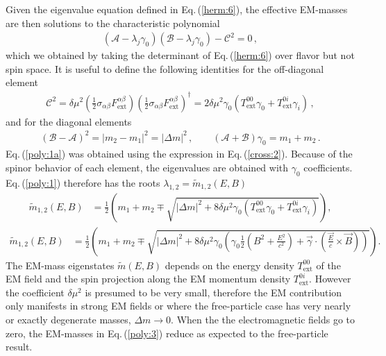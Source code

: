\documentclass{ws-ijmpa}
\newcommand{\req}[1]{Eq.\,(\ref{#1})}
\begin{document}
Given the eigenvalue equation defined in \req{herm:6}, the effective EM-masses are then solutions to the characteristic polynomial
\begin{align}
\label{poly:1}
(\mathcal{A}-\lambda_{j}\gamma_{0})(\mathcal{B}-\lambda_{j}\gamma_{0})-\mathcal{C}^{2}=0\,,
\end{align}
which we obtained by taking the determinant of \req{herm:6} over flavor but not spin space. It is useful to define the following identities for the off-diagonal element
\begin{align}
\label{poly:1a}
\mathcal{C}^{2} = 
\delta\mu^{2}\left(\frac{1}{2}\sigma_{\alpha\beta}F^{\alpha\beta}_\mathrm{ext}\right)\left(\frac{1}{2}\sigma_{\alpha\beta}F^{\alpha\beta}_\mathrm{ext}\right)^{\dag}=
2\delta\mu^{2}\gamma_{0}\left(T_\mathrm{ext}^{00}\gamma_{0}+T_\mathrm{ext}^{0i}\gamma_{i}\right)\,,
\end{align}
and for the diagonal elements
\begin{align}
(\mathcal{B}-\mathcal{A})^{2} = |m_{2}-m_{1}|^{2} = |\Delta m|^{2}\,,\qquad (\mathcal{A}+\mathcal{B})\gamma_{0} = m_{1} + m_{2}\,.
\end{align}
\req{poly:1a} was obtained using the expression in \req{cross:2}. Because of the spinor behavior of each element, the eigenvalues are obtained with $\gamma_{0}$ coefficients. \req{poly:1} therefore has the roots $\lambda_{1,2} = \widetilde m_{1,2}(E,B)$
\begin{align}
\label{poly:2}
\widetilde m_{1,2}(E,B)\! &=\! \frac{1}{2}\left(m_{1}\!+\!m_{2}\!\mp\!\sqrt{|\Delta m|^{2}\!+\!8\delta\mu^{2}\gamma_{0}\left(T_\mathrm{ext}^{00}\gamma_{0}+T_\mathrm{ext}^{0i}\gamma_{i}\right)}\right)\!,
\end{align}
%
\begin{align}
\label{poly:3}
\widetilde m_{1,2}(E,B)\! &=\! \frac{1}{2}\left(m_{1}\!+\!m_{2}\!\mp\!\sqrt{|\Delta m|^{2}\!+\!8\delta\mu^{2}\gamma_{0}\left(\gamma_{0}\frac{1}{2}\left(B^{2}\!+\!\frac{E^{2}}{c^{2}}\right)\!+\!\vec{\gamma}\!\cdot\!(\frac{\vec{E}}{c}\times\vec{B})\right)}\right)\!.
\end{align}
The EM-mass eigenstates $\widetilde m(E,B)$ depends on the energy density $T_\mathrm{ext}^{00}$ of the EM field and the spin projection along the EM momentum density $T_\mathrm{ext}^{0i}$. However the coefficient $\delta\mu^{2}$ is presumed to be very small, therefore the EM contribution only manifests in strong EM fields or where the free-particle case has very nearly or exactly degenerate masses, $\Delta m\to 0$. When the the electromagnetic fields go to zero, the EM-masses in \req{poly:3} reduce as expected to the free-particle result.
\end{document}
